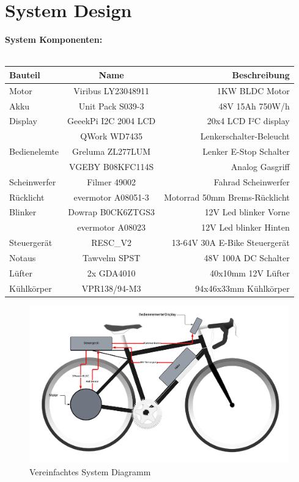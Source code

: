 \documentclass[paper=a4,11pt]{scrreprt}
\begin{document}
\chapter{System Design}
\textbf{System Komponenten:}\\
\\
\begin{tabular}[h]{l|c|r}
\label{SysKomp}
\textbf{Bauteil} & \textbf{Name} & \textbf{Beschreibung} \\
\hline
Motor & Viribus LY23048911 & 1KW BLDC Motor \\
\hline
Akku & Unit Pack S039-3 & 48V 15Ah 750W/h\\
\hline
Display & GeeekPi I2C 2004 LCD & 20x4 LCD I²C display\\
\hline
 & QWork WD7435 & Lenkerschalter-Beleucht\\  
Bedienelemte & Greluma ZL277LUM & Lenker E-Stop Schalter\\
 & VGEBY B08KFC114S & Analog Gasgriff\\
 \hline
Scheinwerfer & Filmer 49002 & Fahrad Scheinwerfer\\
\hline
Rücklicht & evermotor A08051-3 & Motorrad 50mm Brems-Rücklicht\\
\hline
Blinker & Dowrap B0CK6ZTGS3 & 12V Led blinker Vorne\\
 & evermotor A08023 & 12V Led blinker Hinten\\
\hline
Steuergerät & RESC\_V2 & 13-64V 30A E-Bike Steuergerät\\
\hline
Notaus & Tawvelm SPST & 48V 100A DC Schalter\\
\hline
Lüfter & 2x GDA4010 & 40x10mm 12V Lüfter\\
\hline
Kühlkörper & VPR138/94-M3 & 94x46x33mm Kühlkörper\\
\end{tabular}

\begin{figure}[ht]
\begin{center}
\includegraphics[angle=90,width=12cm]{Bilder/EBike System.PNG}
\caption{Vereinfachtes System Diagramm}
\label{EBike_sys}
\end{center}
\end{figure}
\end{document}
